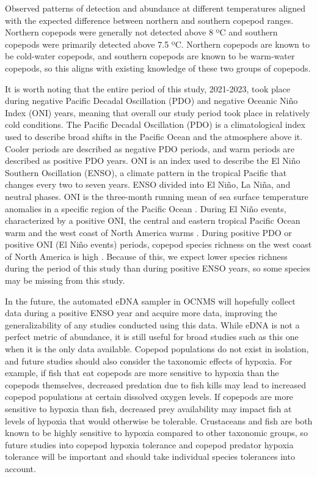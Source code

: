 \documentclass[12pt,twoside]{reedthesis}
\begin{document}
	Observed patterns of detection and abundance at different temperatures aligned with the expected difference between northern and southern copepod ranges. Northern copepods were generally not detected above 8 ºC and southern copepods were primarily detected above 7.5 ºC. Northern copepods are known to be cold-water copepods, and southern copepods are known to be warm-water copepods, so this aligns with existing knowledge of these two groups of copepods. 
	
	It is worth noting that the entire period of this study, 2021-2023, took place during negative Pacific Decadal Oscillation (PDO) and negative Oceanic Niño Index (ONI) years, meaning that overall our study period took place in relatively cold conditions. The Pacific Decadal Oscillation (PDO) is a climatological index used to describe broad shifts in the Pacific Ocean and the atmosphere above it. Cooler periods are described as negative PDO periods, and warm periods are described as positive PDO years. ONI is an index used to describe the El Niño Southern Oscillation (ENSO), a climate pattern in the tropical Pacific that changes every two to seven years. ENSO divided into El Niño, La Niña, and neutral phases. ONI is the three-month running mean of sea surface temperature anomalies in a specific region of the Pacific Ocean \autocite{ClimatePredictionCenterInternetTeam}. During El Niño events, characterized by a positive ONI, the central and eastern tropical Pacific Ocean warm and the west coast of North America warms \autocite{LHeureux2014}. During positive PDO or positive ONI (El Niño events) periods, copepod species richness on the west coast of North America is high \autocite{NOAAFisheries2024}. Because of this, we expect lower species richness during the period of this study than during positive ENSO years, so some species may be missing from this study. 
	
	In the future, the automated eDNA sampler in OCNMS will hopefully collect data during a positive ENSO year and acquire more data, improving the generalizability of any studies conducted using this data. While eDNA is not a perfect metric of abundance, it is still useful for broad studies such as this one when it is the only data available. Copepod populations do not exist in isolation, and future studies should also consider the taxonomic effects of hypoxia. For example, if fish that eat copepods are more sensitive to hypoxia than the copepods themselves, decreased predation due to fish kills may lead to increased copepod populations at certain dissolved oxygen levels. If copepods are more sensitive to hypoxia than fish, decreased prey availability may impact fish at levels of hypoxia that would otherwise be tolerable. Crustaceans and fish are both known to be highly sensitive to hypoxia compared to other taxonomic groups, so future studies into copepod hypoxia tolerance and copepod predator hypoxia tolerance will be important and should take individual species tolerances into account.
   
\end{document}
